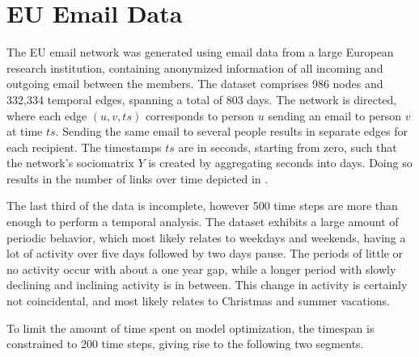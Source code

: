 \section{EU Email Data}

The EU email network was generated using email data from a large European research institution, containing anonymized information of all incoming and outgoing email between the members. The dataset comprises 986 nodes and 332,334 temporal edges, spanning a total of 803 days. The network is directed, where each edge $(u,v,ts)$ corresponds to person $u$ sending an email to person $v$ at time $ts$. Sending the same email to several people results in separate edges for each recipient. The timestamps $ts$ are in seconds, starting from zero, such that the network's sociomatrix $Y$ is created by aggregating seconds into days. Doing so results in the number of links over time depicted in .

The last third of the data is incomplete, however 500 time steps are more than enough to perform a temporal analysis. 
The dataset exhibits a large amount of periodic behavior, which most likely relates to weekdays and weekends, having a lot of activity over five days followed by two days pause. The periods of little or no activity occur with about a one year gap, while a longer period with slowly declining and inclining activity is in between. This change in activity is certainly not coincidental, and most likely relates to Christmas and summer vacations.

To limit the amount of time spent on model optimization, the timespan is constrained to 200 time steps, giving rise to the following two segments.
